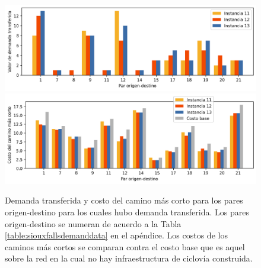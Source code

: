 \begin{figure}[h!]
  \centering
  \includegraphics[width=12cm]{../resources/sensibility_case_study_demand.png}
  \includegraphics[width=12cm]{../resources/sensibility_case_study_shortest_paths.png}
  \caption{Demanda transferida y costo del camino más corto para los pares origen-destino para los cuales hubo demanda transferida. Los pares origen-destino se numeran de acuerdo a la Tabla \ref{table:siouxfallsdemanddata} en el apéndice. Los costos de los caminos más cortos se comparan contra el costo base que es aquel sobre la red en la cual no hay infraestructura de ciclovía construida.}
  \label{fig:sensibilitybyodpair_11_12_13}
\end{figure}

